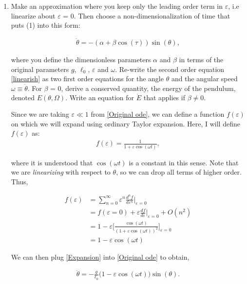 \documentclass[12pt]{article}
\newcommand{\ep}{\varepsilon}
\begin{document}
\begin{enumerate}[]
    \item Make an approximation where you keep only the leading order term in $\ep$, i.e linearize about $\varepsilon$ = 0. Then choose a non-dimensionalization of time that puts (1) into this form:

    \begin{align}
        \ddot{\theta} = -(\alpha + \beta \cos(\tau))\sin(\theta),   \label{linearish}
    \end{align}

        where you define the dimensionless parameters $\alpha$ and $\beta$ in terms of the original parameters $g$, $\ell_0$, $\varepsilon$ and $\omega$. Re-write the second order equation \ref{linearish} as two first order equations for the angle $\theta$ and the angular speed $\omega \equiv \dot{\theta}$. For $\beta$ = 0, derive a conserved quantity, the energy of the pendulum, denoted $E(\theta, \Omega)$. Write an equation for $\dot{E}$ that applies if $\beta \neq 0$.
        \begin{solution}

        Since we are taking $\ep \ll 1$ from \ref{Original ode}, we can define a function $f(\ep)$ on which we will expand using ordinary Taylor expansion. Here, I will define $f(\ep)$ as:
        \begin{align}
            f(\ep) = \frac{1}{1 + \ep \cos(\omega t)},
        \end{align}

        where it is understood that $\cos(\omega t)$ is a constant in this sense. Note that we are \textit{linearizing} with respect to $\theta$, so we can drop all terms of higher order. Thus, 

        \begin{align}
            f(\ep) &= \sum_{n = 0}^\infty \ep^n\frac{d^nf}{d\ep^n} \Big\rvert_{\ep = 0} \nonumber \\
            &= f(\ep = 0) + \ep\frac{df}{d\ep} \Big\rvert_{\ep = 0} + O(n^2)  \nonumber \\
            &= 1 - \ep \bigg[ \frac{\cos(\omega t)}{(1 + \ep\cos(\omega t))^2} \bigg]_{\ep = 0}  \nonumber \\
            & = 1 - \ep \cos(\omega t) \label{Expansion} 
        \end{align}

        We can then plug \ref{Expansion} into \ref{Original ode} to obtain,

        \begin{align}
            \ddot{\theta} = -\frac{g}{\ell_0}\Big(1 - \ep \cos(\omega t)\Big)\sin(\theta). \label{before parameters}
        \end{align}


\end{solution}
\end{enumerate}
\end{document}
